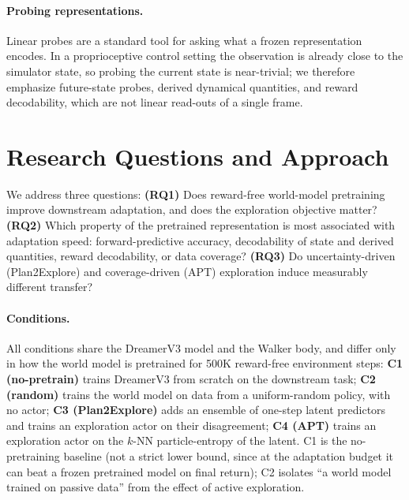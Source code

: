 \documentclass{article}
\begin{document}
\paragraph{Probing representations.}
Linear probes \citep{alain2016probes} are a standard tool for asking what a
frozen representation encodes. In a proprioceptive control setting the
observation is already close to the simulator state, so probing the
current state is near-trivial; we therefore emphasize future-state
probes, derived dynamical quantities, and reward decodability, which are not
linear read-outs of a single frame.

\section{Research Questions and Approach}

We address three questions:
\textbf{(RQ1)} Does reward-free world-model pretraining improve downstream
adaptation, and does the exploration objective matter?
\textbf{(RQ2)} Which property of the pretrained representation is most
associated with adaptation speed: forward-predictive accuracy, decodability
of state and derived quantities, reward decodability, or data coverage?
\textbf{(RQ3)} Do uncertainty-driven (Plan2Explore) and coverage-driven (APT)
exploration induce measurably different transfer?

\paragraph{Conditions.}
All conditions share the DreamerV3 model and the Walker body, and differ only in
how the world model is pretrained for 500K reward-free environment steps:
\textbf{C1 (no-pretrain)} trains DreamerV3 from scratch on the downstream task;
\textbf{C2 (random)} trains the world model on data from a uniform-random
policy, with no actor; \textbf{C3 (Plan2Explore)} adds an ensemble of one-step
latent predictors and trains an exploration actor on their disagreement;
\textbf{C4 (APT)} trains an exploration actor on the $k$-NN particle-entropy of
the latent. C1 is the no-pretraining baseline (not a strict lower bound, since
at the adaptation budget it can beat a frozen pretrained model on final return);
C2 isolates ``a world model trained on passive data'' from the effect of active
exploration.
\end{document}
